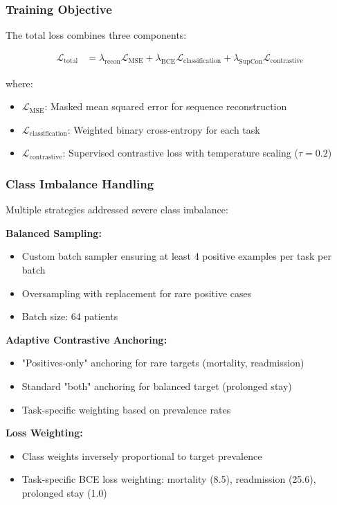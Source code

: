 \documentclass[11pt]{article}
\begin{document}
\subsubsection{Training Objective}
The total loss combines three components:

\begin{align}
\mathcal{L}_{\text{total}} &= \lambda_{\text{recon}} \mathcal{L}_{\text{MSE}} + \lambda_{\text{BCE}} \mathcal{L}_{\text{classification}} + \lambda_{\text{SupCon}} \mathcal{L}_{\text{contrastive}}
\end{align}

where:
\begin{itemize}
    \item $\mathcal{L}_{\text{MSE}}$: Masked mean squared error for sequence reconstruction
    \item $\mathcal{L}_{\text{classification}}$: Weighted binary cross-entropy for each task
    \item $\mathcal{L}_{\text{contrastive}}$: Supervised contrastive loss with temperature scaling ($\tau = 0.2$)
\end{itemize}

\subsubsection{Class Imbalance Handling}
Multiple strategies addressed severe class imbalance:

\textbf{Balanced Sampling:}
\begin{itemize}
    \item Custom batch sampler ensuring at least 4 positive examples per task per batch
    \item Oversampling with replacement for rare positive cases
    \item Batch size: 64 patients
\end{itemize}

\textbf{Adaptive Contrastive Anchoring:}
\begin{itemize}
    \item "Positives-only" anchoring for rare targets (mortality, readmission)
    \item Standard "both" anchoring for balanced target (prolonged stay)
    \item Task-specific weighting based on prevalence rates
\end{itemize}

\textbf{Loss Weighting:}
\begin{itemize}
    \item Class weights inversely proportional to target prevalence
    \item Task-specific BCE loss weighting: mortality (8.5), readmission (25.6), prolonged stay (1.0)
\end{itemize}
\end{document}
